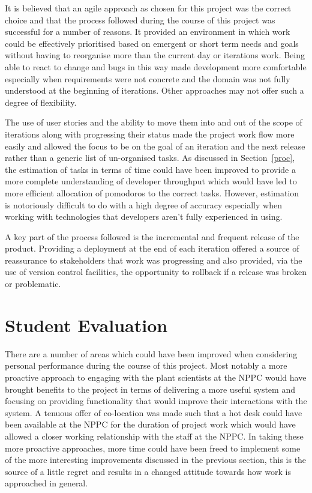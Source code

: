 It is believed that an agile approach as chosen for this project was the correct choice and that the process followed during the course of this project was successful for a number of reasons. It provided an environment in which work could be effectively prioritised based on emergent or short term needs and goals without having to reorganise more than the current day or iterations work. Being able to react to change and bugs in this way made development more comfortable especially when requirements were not concrete and the domain was not fully understood at the beginning of iterations. Other approaches may not offer such a degree of flexibility.

The use of user stories and the ability to move them into and out of the scope of iterations along with progressing their status made the project work flow more easily and allowed the focus to be on the goal of an iteration and the next release rather than a generic list of un-organised tasks.  As discussed in Section~\ref{proc}, the estimation of tasks in terms of time could have been improved to provide a more complete understanding of developer throughput which would have led to more efficient allocation of pomodoros to the correct tasks. However, estimation is notoriously difficult to do with a high degree of accuracy especially when working with technologies that developers aren't fully experienced in using.

A key part of the process followed is the incremental and frequent release of the product. Providing a deployment at the end of each iteration offered a source of reassurance to stakeholders that work was progressing and also provided, via the use of version control facilities, the opportunity to rollback if a release was broken or problematic.

\section{Student Evaluation}
There are a number of areas which could have been improved when considering personal performance during the course of this project. Most notably a more proactive approach to engaging with the plant scientists at the NPPC would have brought benefits to the project in terms of delivering a more useful system and focusing on providing functionality that would improve their interactions with the system. A tenuous offer of co-location was made such that a hot desk could have been available at the NPPC for the duration of project work which would have allowed a closer working relationship with the staff at the NPPC. In taking these more proactive approaches, more time could have been freed to implement some of the more interesting improvements discussed in the previous section, this is the source of a little regret and results in a changed attitude towards how work is approached in general.

